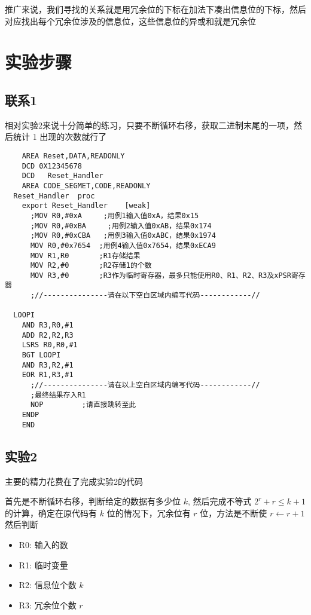 \documentclass[a4paper,10pt,UTF8]{paper}
\numberwithin{equation}{section}
\numberwithin{figure}{section}
\begin{document}
推广来说，我们寻找的关系就是用冗余位的下标在加法下凑出信息位的下标，然后对应找出每个冗余位涉及的信息位，这些信息位的异或和就是冗余位

\section{实验步骤}

\subsection{联系1}

相对实验2来说十分简单的练习，只要不断循环右移，获取二进制末尾的一项，然后统计 1 出现的次数就行了

\begin{verbatim}
    AREA Reset,DATA,READONLY
    DCD 0X12345678
    DCD   Reset_Handler
    AREA CODE_SEGMET,CODE,READONLY
  Reset_Handler  proc
    export Reset_Handler    [weak]
      ;MOV R0,#0xA     ;用例1输入值0xA，结果0x15
      ;MOV R0,#0xBA     ;用例2输入值0xAB，结果0x174
      ;MOV R0,#0xCBA   ;用例3输入值0xABC，结果0x1974
      MOV R0,#0x7654  ;用例4输入值0x7654，结果0xECA9
      MOV R1,R0       ;R1存储结果
      MOV R2,#0       ;R2存储1的个数
      MOV R3,#0       ;R3作为临时寄存器，最多只能使用R0、R1、R2、R3及xPSR寄存器
      ;//---------------请在以下空白区域内编写代码------------//

  LOOPI
    AND R3,R0,#1
    ADD R2,R2,R3
    LSRS R0,R0,#1
    BGT LOOPI
    AND R3,R2,#1
    EOR R1,R3,#1
      ;//---------------请在以上空白区域内编写代码------------//
      ;最终结果存入R1
      NOP         ;请直接跳转至此
    ENDP
    END
\end{verbatim}
\subsection{实验2}

主要的精力花费在了完成实验2的代码

首先是不断循环右移，判断给定的数据有多少位 $k$, 然后完成不等式 $2^r+r \le k+1$ 的计算，确定在原代码有 $k$ 位的情况下，冗余位有 $r$ 位，方法是不断使 $r \leftarrow r+1$ 然后判断

\begin{itemize}
  \item R0: 输入的数
  \item R1: 临时变量
  \item R2: 信息位个数 $k$
  \item R3: 冗余位个数 $r$
\end{itemize}
\end{document}
